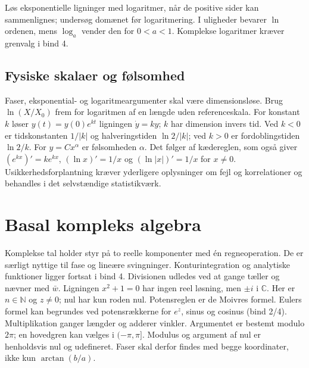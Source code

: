 

Løs eksponentielle ligninger med logaritmer, når de positive sider kan
sammenlignes; undersøg domænet før logaritmering. I uligheder bevarer
$\ln$ ordenen, mens $\log_a$ vender den for $0<a<1$.
Komplekse logaritmer kræver grenvalg i bind 4.

\subsection{Fysiske skalaer og følsomhed}
Faser, eksponential- og logaritmeargumenter skal være dimensionsløse.
Brug $\ln(X/X_0)$ frem for logaritmen af en længde uden referenceskala.
For konstant $k$ løser $y(t)=y(0)e^{kt}$ ligningen $\dot y=ky$;
$k$ har dimension invers tid. Ved $k<0$ er tidskonstanten $1/|k|$ og
halveringstiden $\ln2/|k|$; ved $k>0$ er fordoblingstiden $\ln2/k$.
For $y=Cx^\alpha$ er følsomheden $\alpha$.
Det følger af kædereglen, som også giver
$(e^{kx})'=ke^{kx}$, $(\ln x)'=1/x$ og $(\ln|x|)'=1/x$ for $x\ne0$.
Usikkerhedsforplantning kræver yderligere oplysninger om fejl og korrelationer
og behandles i det selvstændige statistikværk.

\section{Basal kompleks algebra}
\label{sec:b1-kompleks}
Komplekse tal holder styr på to reelle komponenter med én regneoperation.
De er særligt nyttige til fase og lineære svingninger. Konturintegration
og analytiske funktioner ligger fortsat i bind 4.
Divisionen udledes ved at gange tæller og nævner med $\bar w$.
Ligningen $x^2+1=0$ har ingen reel løsning, men $\pm i$ i $\mathbb C$.
Her er $n\in\mathbb N$ og $z\ne0$; nul har kun roden nul.
Potensreglen er de Moivres formel. Eulers formel kan begrundes ved potensrækkerne for $e^z$, sinus og cosinus
(bind 2/4). Multiplikation ganger længder og adderer vinkler.
Argumentet er bestemt modulo $2\pi$; en hovedgren kan vælges i $(-\pi,\pi]$.
Modulus og argument af nul er henholdsvis nul og udefineret.
Faser skal derfor findes med begge koordinater, ikke kun $\arctan(b/a)$.

